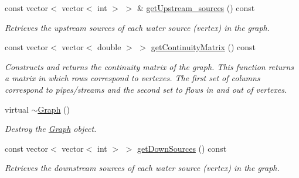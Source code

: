 \begin{DoxyCompactItemize}
const vector$<$ vector$<$ int $>$ $>$ \& \mbox{\hyperlink{classGraph_a1ae92c80c49d220aff1e04f653db1e9e}{get\+Upstream\+\_\+sources}} () const
\begin{DoxyCompactList}\small\item\em Retrieves the upstream sources of each water source (vertex) in the graph. \end{DoxyCompactList}\item 
const vector$<$ vector$<$ double $>$ $>$ \mbox{\hyperlink{classGraph_adeb6eb873f20aef3e2b611a322deb647}{get\+Continuity\+Matrix}} () const
\begin{DoxyCompactList}\small\item\em Constructs and returns the continuity matrix of the graph. This function returns a matrix in which rows correspond to vertexes. The first set of columns correspond to pipes/streams and the second set to flows in and out of vertexes. \end{DoxyCompactList}\item 
virtual \mbox{\hyperlink{classGraph_a1621cd1ffcf6a135cbc7e039c305627b}{$\sim$\+Graph}} ()
\begin{DoxyCompactList}\small\item\em Destroy the \mbox{\hyperlink{classGraph}{Graph}} object. \end{DoxyCompactList}\item 
const vector$<$ vector$<$ int $>$ $>$ \mbox{\hyperlink{classGraph_aa41b35e6be8f6c4d555c7e9c1822809e}{get\+Down\+Sources}} () const
\begin{DoxyCompactList}\small\item\em Retrieves the downstream sources of each water source (vertex) in the graph. \end{DoxyCompactList}\end{DoxyCompactItemize}
